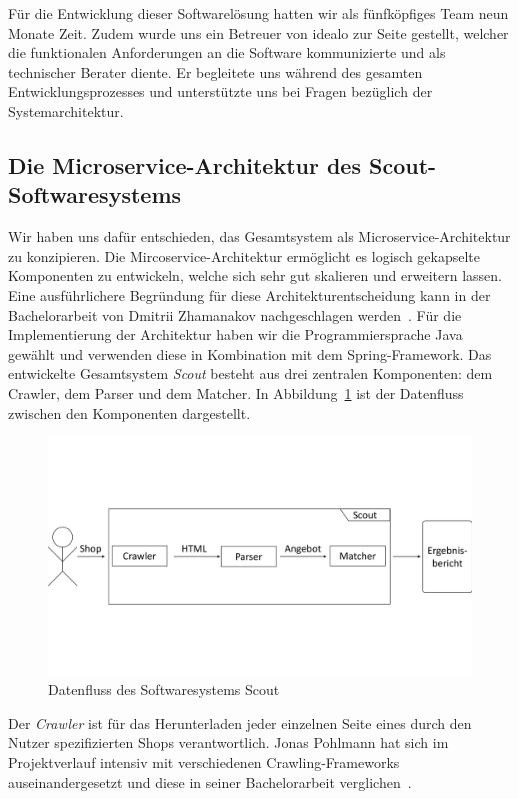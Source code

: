 Für die Entwicklung dieser Softwarelösung hatten wir als fünfköpfiges Team neun Monate Zeit.
Zudem wurde uns ein Betreuer von idealo zur Seite gestellt, welcher die funktionalen Anforderungen an die
Software kommunizierte und als technischer Berater diente.
Er begleitete uns während des gesamten Entwicklungsprozesses und unterstützte uns bei Fragen bezüglich der
Systemarchitektur.

\subsection{Die Microservice-Architektur des Scout-Softwaresystems}
\label{subsec:microservice-architektur}

Wir haben uns dafür entschieden, das Gesamtsystem als Microservice-Architektur zu konzipieren.
Die Mircoservice-Architektur ermöglicht es logisch gekapselte Komponenten zu entwickeln, welche sich sehr gut
skalieren und erweitern lassen.
Eine ausführlichere Begründung für diese Architekturentscheidung kann in der Bachelorarbeit von Dmitrii
Zhamanakov nachgeschlagen werden~\cite{thesis:dmitrii}.
Für die Implementierung der Architektur haben wir die Programmiersprache Java gewählt und verwenden diese in
Kombination mit dem Spring-Framework\footnotemark.
Das entwickelte Gesamtsystem \textit{Scout} besteht aus drei zentralen Komponenten: dem Crawler, dem Parser und dem
Matcher.
In Abbildung~\ref{abb:datenfluss-grob} ist der Datenfluss zwischen den Komponenten dargestellt.
\begin{figure}[H]
    \centering
    \includegraphics[width=\textwidth, trim=0 5.5cm 0 5.5cm, clip]{resources/Datenfluss-Gesamt-Grob.pdf}
    \caption{Datenfluss des Softwaresystems Scout}
    \label{abb:datenfluss-grob}
    \vspace{-0.25cm}
\end{figure}
Der \textit{Crawler} ist für das Herunterladen jeder einzelnen Seite eines durch den Nutzer spezifizierten Shops
verantwortlich.
Jonas Pohlmann hat sich im Projektverlauf intensiv mit verschiedenen Crawling-Frameworks auseinandergesetzt und diese
in seiner Bachelorarbeit verglichen~\cite{thesis:jonas}.

